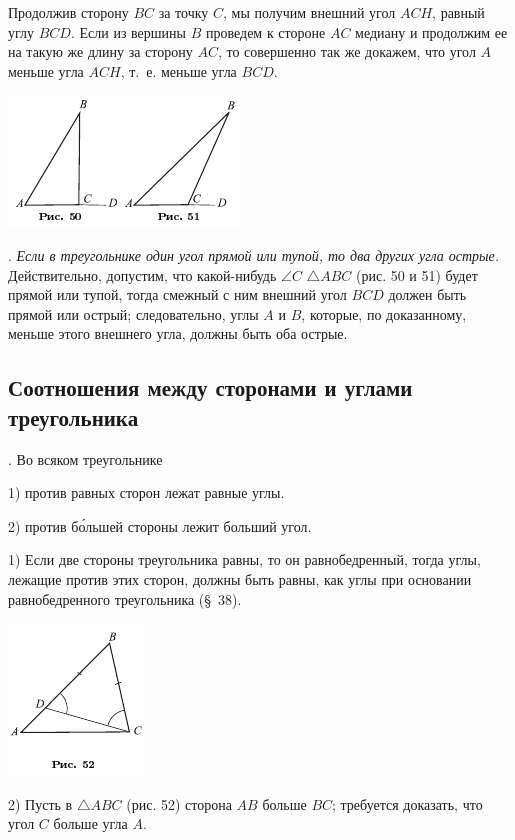 \documentclass[oneside]{book}
\begin{document}
Продолжив сторону $BC$ за точку $C$, мы получим внешний угол $ACH$, равный углу $BCD$.
Если из вершины $B$ проведем к стороне $AC$ медиану и продолжим ее на такую же длину за сторону $AC$, то совершенно так же докажем, что угол $A$ меньше угла $ACH$, т.~е. меньше угла $BCD$.

\includegraphics{pics/ris-50-51}

.
\emph{Если в треугольнике один угол прямой или тупой, то два других угла острые.}
Действительно, допустим, что какой-нибудь $\angle C$ $\triangle ABC$ %
(рис. 50 и 51) будет прямой или тупой, тогда смежный с ним внешний угол $BCD$ должен быть прямой или острый;
следовательно, углы $A$ и $B$, которые, по доказанному, меньше этого внешнего угла, должны быть оба острые.

\subsection*{Соотношения между сторонами и углами треугольника}

.
Во всяком треугольнике

1) против равных сторон лежат равные углы.

2) против б\'{о}льшей стороны лежит больший угол.

1) Если две стороны треугольника равны, то он равнобедренный, тогда углы, лежащие против этих сторон, должны быть равны, как углы при основании равнобедренного треугольника (§~38).

\includegraphics{pics/ris-52}

2) Пусть в $\triangle ABC$ (рис. 52) сторона $AB$ больше $BC$;
требуется доказать, что угол $C$ больше угла $A$.
\end{document}
